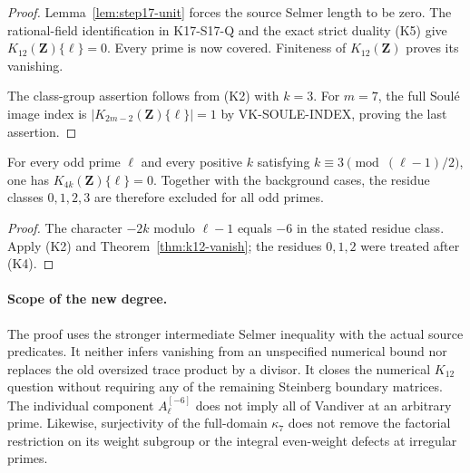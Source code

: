 \begin{proof}
Lemma~\ref{lem:step17-unit} forces the source Selmer length to be zero.
The rational-field identification in K17-S17-Q and the exact strict
duality (K5) give $K_{12}(\mathbf Z)\{\ell\}=0$. Every prime is now
covered. Finiteness of $K_{12}(\mathbf Z)$ proves its vanishing.

The class-group assertion follows from (K2) with $k=3$.
For $m=7$, the full Soul\'e image index is
$|K_{2m-2}(\mathbf Z)\{\ell\}|=1$ by VK-SOULE-INDEX, proving the
last assertion.
\end{proof}

\begin{corollary}[K17-K12-PERIOD]\label{cor:k12-period}
For every odd prime $\ell$ and every positive $k$ satisfying
$k\equiv3\pmod{(\ell-1)/2}$, one has
$K_{4k}(\mathbf Z)\{\ell\}=0$.
Together with the background cases, the residue classes
$0,1,2,3$ are therefore excluded for all odd primes.
\end{corollary}
\begin{proof}
The character $-2k$ modulo $\ell-1$ equals $-6$ in the stated residue
class. Apply (K2) and Theorem~\ref{thm:k12-vanish}; the residues
$0,1,2$ were treated after (K4).
\end{proof}

\paragraph{Scope of the new degree.}
The proof uses the stronger intermediate Selmer inequality with the
actual source predicates. It neither infers vanishing from an
unspecified numerical bound nor replaces the old oversized trace
product by a divisor. It closes the numerical $K_{12}$ question without
requiring any of the remaining Steinberg boundary matrices.
The individual component $A_\ell^{[-6]}$ does not imply all of Vandiver
at an arbitrary prime. Likewise, surjectivity of the full-domain
$\kappa_7$ does not remove the factorial restriction on its weight
subgroup or the integral even-weight defects at irregular primes.
